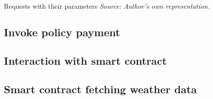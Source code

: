 \begin{table}[h]
    \centering
    
    \caption{Requests with their parameters \textit{Source: Author's own representation.}}
    \label{tab:flowRequests}
\end{table}

\subsection{Invoke policy payment}

\subsection{Interaction with smart contract}
\subsection{Smart contract fetching weather data}